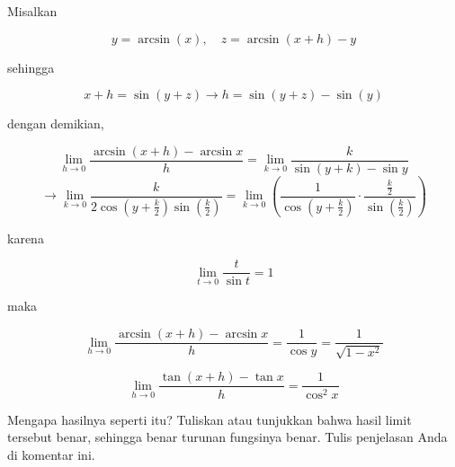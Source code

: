 \documentclass[a4paper,11pt,oneside,enabledeprecatedfontcommands]{scrbook}
\newenvironment{eulernotebook}{}{}
\newenvironment{eulercomment}{\par\medskip\noindent}{\par\medskip}
\newenvironment{eulerformula}{}{}
\begin{document}
\begin{eulernotebook}
\begin{eulercomment}
Misalkan 
\end{eulercomment}
\begin{eulerformula}
\[
y=\arcsin(x), \quad z=\arcsin(x+h)-y
\]
\end{eulerformula}
\begin{eulercomment}
sehingga
\end{eulercomment}
\begin{eulerformula}
\[
x+h=\sin(y+z) \rightarrow h=\sin(y+z)-\sin(y)
\]
\end{eulerformula}
\begin{eulercomment}
dengan demikian, 
\end{eulercomment}
\begin{eulerformula}
\[
\lim_{h \to 0} \frac{\arcsin(x+h) - \arcsin x}{h} = \lim_{k \to 0} \frac{k}{\sin(y+k) - \sin y}
\]
\end{eulerformula}
\begin{eulerformula}
\[
\rightarrow \lim_{k \to 0} \frac{k}{2 \cos\left(y + \frac{k}{2}\right) \sin\left(\frac{k}{2}\right)} = \lim_{k \to 0} \left( \frac{1}{\cos\left(y + \frac{k}{2}\right)} \cdot \frac{\frac{k}{2}}{\sin\left(\frac{k}{2}\right)} \right)
\]
\end{eulerformula}
\begin{eulercomment}
karena 
\end{eulercomment}
\begin{eulerformula}
\[
\lim_{t \to 0} \frac{t}{\sin t} = 1
\]
\end{eulerformula}
\begin{eulercomment}
maka
\end{eulercomment}
\begin{eulerformula}
\[
\lim_{h \to 0} \frac{\arcsin(x+h) - \arcsin x}{h} = \frac{1}{\cos y} = \frac{1}{\sqrt{1-x^2}}
\]
\end{eulerformula}
\begin{eulerformula}
\[
\lim_{h\rightarrow 0}{\frac{\tan \left(x+h\right)-\tan x}{h}}=  \frac{1}{\cos ^2x}
\]
\end{eulerformula}
\begin{eulercomment}
Mengapa hasilnya seperti itu? Tuliskan atau tunjukkan bahwa hasil limit tersebut benar, sehingga benar turunan fungsinya benar. Tulis penjelasan Anda di komentar ini.
\end{eulercomment}
\begin{eulerformula}

\end{eulerformula}
\end{eulernotebook}
\end{document}
